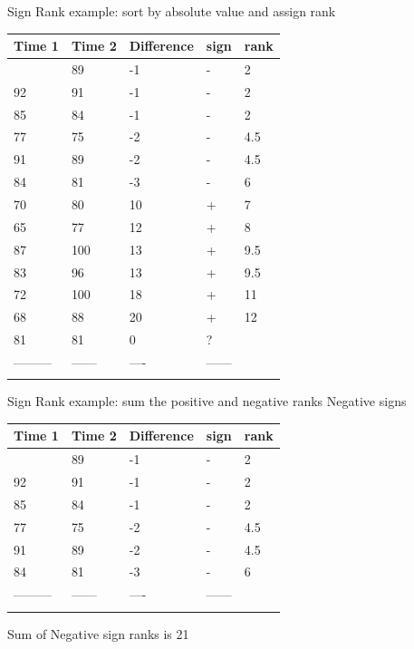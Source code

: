 \documentclass[
  ignorenonframetext,
  aspectratio=169]{beamer}
\renewcommand{\textbf}{\structure}
\begin{document}
\begin{frame}{Sign Rank example: sort by absolute value and assign rank}
\protect\hypertarget{sign-rank-example-sort-by-absolute-value-and-assign-rank}{}
\begin{longtable}[]{@{}lllll@{}}
\toprule\noalign{}
Time 1 & Time 2 & Difference & sign & rank \\
\midrule\noalign{}
\endhead
90 & 89 & -1 & - & 2 \\
92 & 91 & -1 & - & 2 \\
85 & 84 & -1 & - & 2 \\
77 & 75 & -2 & - & 4.5 \\
91 & 89 & -2 & - & 4.5 \\
84 & 81 & -3 & - & 6 \\
70 & 80 & 10 & + & 7 \\
65 & 77 & 12 & + & 8 \\
87 & 100 & 13 & + & 9.5 \\
83 & 96 & 13 & + & 9.5 \\
72 & 100 & 18 & + & 11 \\
68 & 88 & 20 & + & 12 \\
81 & 81 & 0 & ? & \textbf{drop} \\
--------- & ------ & ---- & ------ & \\
\bottomrule\noalign{}
\end{longtable}
\end{frame}

\begin{frame}{Sign Rank example: sum the positive and negative ranks}
\protect\hypertarget{sign-rank-example-sum-the-positive-and-negative-ranks}{}
Negative signs

\begin{longtable}[]{@{}lllll@{}}
\toprule\noalign{}
Time 1 & Time 2 & Difference & sign & rank \\
\midrule\noalign{}
\endhead
90 & 89 & -1 & - & 2 \\
92 & 91 & -1 & - & 2 \\
85 & 84 & -1 & - & 2 \\
77 & 75 & -2 & - & 4.5 \\
91 & 89 & -2 & - & 4.5 \\
84 & 81 & -3 & - & 6 \\
--------- & ------ & ---- & ------ & \\
\bottomrule\noalign{}
\end{longtable}

Sum of Negative sign ranks is 21
\end{frame}
\end{document}
